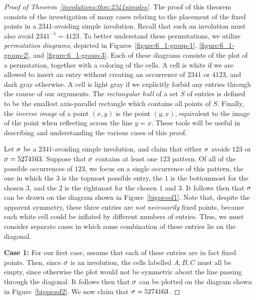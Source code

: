       \begin{proof}[Proof of Theorem~\ref{involutions:thm:2341simples}] 

        The proof of this theorem consists of the investigation of many cases
        relating to the placement of the fixed points in a $2341$-avoiding
        simple involution. Recall that such an involution must also avoid
        $2341^{-1} = 4123$. To better understand these permutations, we utilize
        \emph{permutation diagrams}, depicted in
        Figures~\ref{figure:6_1-group-1}, \ref{figure:6_1-group-2}, and
        \ref{figure:6_1-group-3}.
        Each of these diagrams consists of the plot of a permutation, together
        with a coloring of the cells. A cell is white if we are allowed to
        insert an entry without creating an occurrence of $2341$ or $4123$, and
        dark gray otherwise. A cell is light gray if we explicitly forbid any
        entries through the course of our arguments. The \emph{rectangular
        hull} of a set $S$ of entries is defined to be the smallest
        axis-parallel rectangle which contains all points of $S$. Finally, the
        \emph{inverse image} of a point $(x,y)$ is the point $(y,x)$,
        equivalent to the image of the point when reflecting across the line
        $y=x$. These tools will be useful in describing and understanding the
        various cases of this proof. 
          
        Let $\sigma$ be a $2341$-avoiding simple involution, and claim that either
        $\sigma$ avoids $123$ or $\sigma = 5274163$. Suppose that $\sigma$ contains at
        least one $123$ pattern. 
        Of all of the possible occurrences of $123$, 
        we focus on a single occurrence of this
        pattern, the one in which the $3$ is the topmost possible entry, the
        $1$ is the bottommost for the chosen $3$, and the $2$ is the rightmost
        for the chosen $1$ and $3$. It follows then that $\sigma$ can be drawn on
        the diagram shown in Figure~\ref{bigproof1}. Note that, despite the
        apparent symmetry, these three entries are \emph{not necessarily} fixed
        points, because each white cell could be inflated by different numbers
        of entries. Thus, we must consider separate cases in which some
        combination of these entries lie on the diagonal. 

        


        \textbf{Case 1:}
        For our first case, assume that each of these entries are in fact fixed
        points. Then, since $\sigma$ is an involution, the cells labelled $A,B,C$
        must all be empty, since otherwise the plot would not be symmetric
        about the line passing through the diagonal. It follows then that $\sigma$
        can be plotted on the diagram shown in Figure~\ref{bigproof2}. 
        We now claim that $\sigma = 5274163$. 
        

\end{proof}
